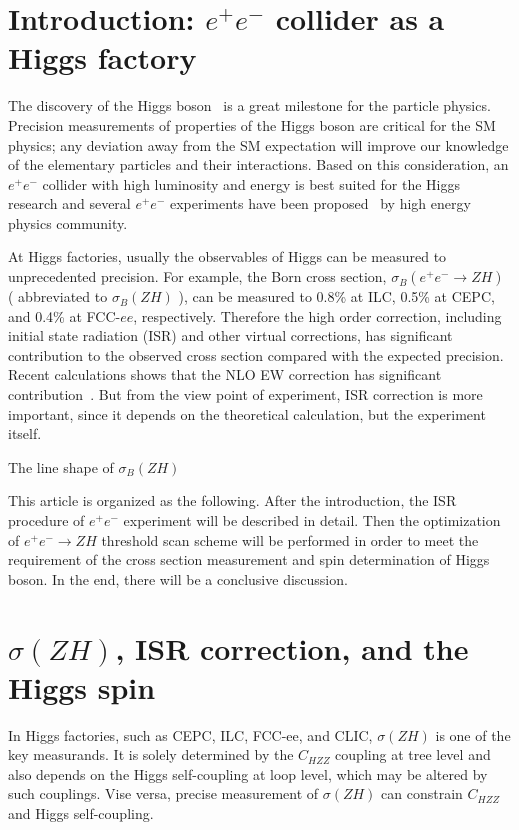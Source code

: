 \documentclass[a4paper,10pt,twoside]{cpc-hepnp}
\begin{document}
\section{Introduction: $e^+e^-$ collider as a Higgs factory}\label{sec:intro}
The discovery of the Higgs boson~\cite{ref:1,ref:2} is a great milestone for the particle physics.  Precision measurements of properties of the Higgs boson are critical for the SM physics; any deviation away from the SM expectation will improve our knowledge of the elementary particles and their interactions. Based on this consideration, an $e^+e^-$ collider with high luminosity and energy is best suited for the Higgs research and several $e^+e^-$ experiments have been proposed{~\cite{ref:ilc, ref:ild, ref:cepc_det, ref:cepc_acc, ref:fccee, ref:clic}} by high energy physics community. 

At Higgs factories, usually the observables of Higgs can be measured to unprecedented precision. For example, the Born cross section, $\sigma_B(e^+e^- \to ZH)$ ( abbreviated to $\sigma_B(ZH)$ ), can be measured to 0.8\% at ILC, 0.5\% at CEPC, and 0.4\%  at FCC-$ee$, respectively.  Therefore the high order correction, including initial state radiation (ISR) and other virtual corrections, has significant contribution to the observed cross section compared with the expected precision.  Recent calculations shows that the NLO EW correction has significant contribution{~\cite{ref:jiayu, ref:yangll}}. But from the view point of experiment, ISR correction is more important, since it depends on the theoretical calculation, but the experiment itself. 


The line shape of $\sigma_B(ZH)$

This article is organized as the following. After the introduction, the ISR procedure of $e^+e^-$ experiment will be described in detail. Then the optimization of $e^+e^- \to ZH$ threshold scan scheme will be performed in order to meet the requirement of  the cross section measurement and spin determination of  Higgs boson. In the end, there will be a conclusive discussion. 

\section{$\sigma(ZH)$, ISR correction, and the Higgs spin\label{sec:presicion}}

In Higgs factories, such as CEPC, ILC, FCC-ee, and CLIC, $\sigma(ZH)$ is one of the key measurands. It is solely determined by the $C_{HZZ}$ coupling at tree level and also depends on the Higgs self-coupling at loop level, which may be altered by such couplings.  Vise versa, precise measurement of $\sigma(ZH)$  can constrain $C_{HZZ}$  and Higgs self-coupling.  
\end{document}
